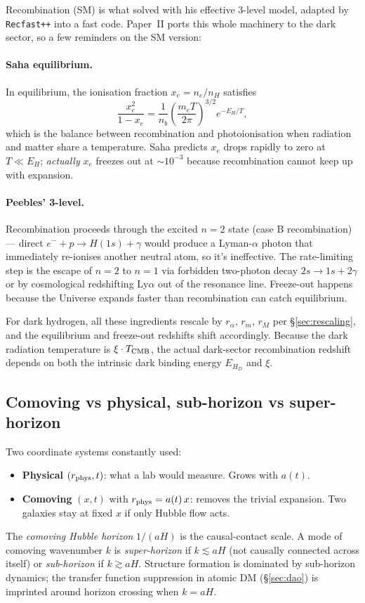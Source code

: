 \documentclass[12pt]{article}
\begin{document}
Recombination (SM) is what \citet{Peebles1968} solved with his
effective 3-level model, adapted by \texttt{Recfast++} into a fast
code.  Paper~II ports this whole machinery to the dark sector, so a
few reminders on the SM version:

\paragraph{Saha equilibrium.}  In equilibrium, the ionisation
fraction $x_e = n_e/n_H$ satisfies
%
\begin{equation}
  \frac{x_e^2}{1-x_e} = \frac{1}{n_b}\left(\frac{m_e T}{2\pi}\right)^{3/2}\!
    e^{-E_H/T},
\end{equation}
%
which is the balance between recombination and photoionisation when
radiation and matter share a temperature.  Saha predicts $x_e$ drops
rapidly to zero at $T\ll E_H$; \emph{actually} $x_e$ freezes out at
$\sim 10^{-3}$ because recombination cannot keep up with expansion.

\paragraph{Peebles' 3-level.}  Recombination proceeds through the
excited $n=2$ state (case B recombination) --- direct $e^-+p\to H(1s)+\gamma$
would produce a Lyman-$\alpha$ photon that immediately re-ionises
another neutral atom, so it's ineffective.  The rate-limiting step is
the escape of $n=2$ to $n=1$ via forbidden two-photon decay
$2s\to 1s + 2\gamma$ or by cosmological redshifting Ly$\alpha$
out of the resonance line.  Freeze-out happens because the Universe
expands faster than recombination can catch equilibrium.

For dark hydrogen, all these ingredients rescale by $r_\alpha$,
$r_m$, $r_M$ per \S\ref{sec:rescaling}, and the equilibrium and
freeze-out redshifts shift accordingly.  Because the dark radiation
temperature is $\xi \cdot T_{\rm CMB}$, the actual dark-sector
recombination redshift depends on both the intrinsic dark binding
energy $E_{H_D}$ and $\xi$.

\subsection{Comoving vs physical, sub-horizon vs super-horizon}

Two coordinate systems constantly used:
%
\begin{itemize}
  \item \textbf{Physical} $(r_{\rm phys}, t)$: what a lab would
        measure.  Grows with $a(t)$.
  \item \textbf{Comoving} $(x, t)$ with $r_{\rm phys} = a(t)\,x$:
        removes the trivial expansion.  Two galaxies stay at
        fixed $x$ if only Hubble flow acts.
\end{itemize}
%
The \emph{comoving Hubble horizon} $1/(aH)$ is the causal-contact
scale.  A mode of comoving wavenumber $k$ is \emph{super-horizon} if
$k \lesssim aH$ (not causally connected across itself) or
\emph{sub-horizon} if $k \gtrsim aH$.  Structure formation is
dominated by sub-horizon dynamics; the transfer function suppression
in atomic DM (\S\ref{sec:dao}) is imprinted around horizon crossing
when $k = aH$.
\end{document}
